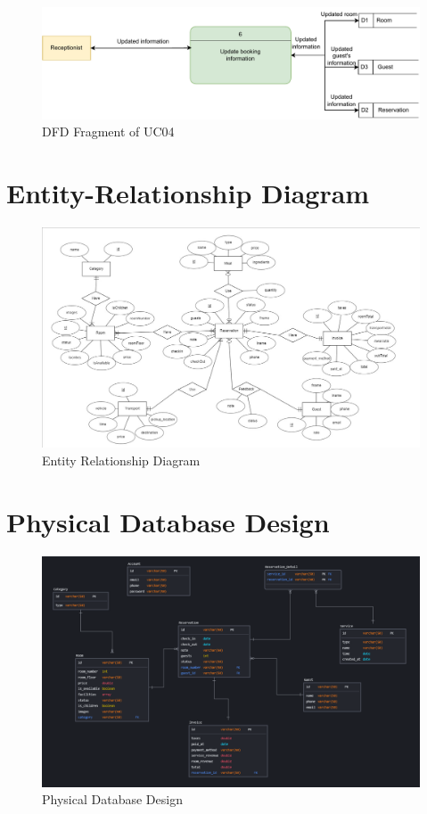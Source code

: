\begin{figure}[H]
    \includegraphics[width=1\linewidth]{img/dfd9.pdf}
    \caption{DFD Fragment of UC04}
    \label{fig:DFD Fragment of UC04}
\end{figure}

\section{Entity-Relationship Diagram}
\begin{figure}[H]
        \includegraphics[width=\textwidth]{img/erd.jpg}
        \caption{Entity Relationship Diagram }
        \label{fig: Entity Relationship Diagram }
    \end{figure}
\section{Physical Database Design}
\begin{figure}[H]
    \includegraphics[width=1\linewidth]{img/physical_dtb.png}
    \caption{Physical Database Design}
    \label{fig:Physical Database Design}
\end{figure}
